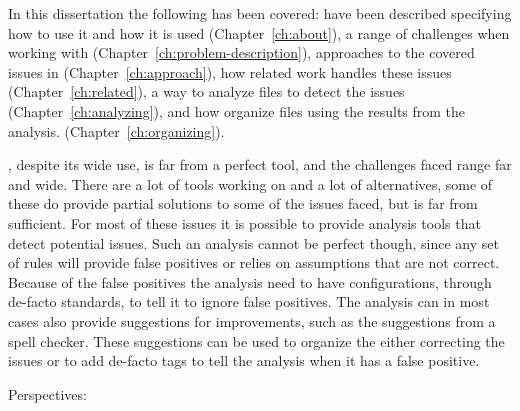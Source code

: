 
In this dissertation the following has been covered: {\bibtex} have
been described specifying how to use it and how it is used
(Chapter~\ref{ch:about}), a range of challenges when working with
{\bibtex} (Chapter~\ref{ch:problem-description}), approaches to the
covered issues in {\bibtex} (Chapter~\ref{ch:approach}), how related
work handles these issues (Chapter~\ref{ch:related}), a way to analyze
{\bibtex} files to detect the issues (Chapter~\ref{ch:analyzing}), and
how organize {\bibtex} files using the results from the analysis.
(Chapter~\ref{ch:organizing}).

{\bibtex}, despite its wide use, is far from a perfect tool, and the
challenges faced range far and wide.  There are a lot of tools working
on {\bibtex} and a lot of alternatives, some of these do provide
partial solutions to some of the issues faced, but is far from
sufficient.  For most of these issues it is possible to provide
analysis tools that detect potential issues.  Such an analysis cannot
be perfect though, since any set of rules will provide false positives
or relies on assumptions that are not correct.  Because of the false
positives the analysis need to have configurations, through de-facto
standards, to tell it to ignore false positives.  The analysis can in
most cases also provide suggestions for improvements, such as the
suggestions from a spell checker.  These suggestions can be used to
organize the  either correcting the issues or to add
de-facto tags to tell the analysis when it has a false positive.

Perspectives: